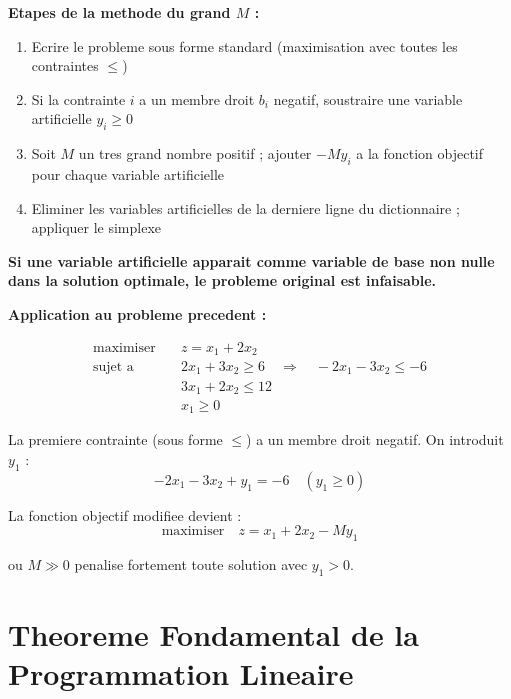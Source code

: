 \documentclass[12pt,a4paper]{article}
\begin{document}
\begin{methode}
\textbf{Etapes de la methode du grand $M$ :}

\begin{enumerate}
    \item Ecrire le probleme sous forme standard (maximisation avec toutes les contraintes $\leq$)
    \item Si la contrainte $i$ a un membre droit $b_i$ negatif, soustraire une variable artificielle $y_i \geq 0$
    \item Soit $M$ un tres grand nombre positif ; ajouter $-My_i$ a la fonction objectif pour chaque variable artificielle
    \item Eliminer les variables artificielles de la derniere ligne du dictionnaire ; appliquer le simplexe
\end{enumerate}

\textcolor{importantrouge}{\textbf{Si une variable artificielle apparait comme variable de base non nulle dans la solution optimale, le probleme original est infaisable.}}
\end{methode}

\begin{exemple}
\textbf{Application au probleme precedent :}

\begin{align*}
\text{maximiser} \quad & z = x_1 + 2x_2\\
\text{sujet a} \quad & 2x_1 + 3x_2 \geq 6 \quad \Rightarrow \quad -2x_1 - 3x_2 \leq -6\\
& 3x_1 + 2x_2 \leq 12\\
& x_1 \geq 0
\end{align*}

La premiere contrainte (sous forme $\leq$) a un membre droit negatif. On introduit $y_1$ :
$$-2x_1 - 3x_2 + y_1 = -6 \quad (y_1 \geq 0)$$

La fonction objectif modifiee devient :
$$\text{maximiser} \quad z = x_1 + 2x_2 - My_1$$

ou $M \gg 0$ penalise fortement toute solution avec $y_1 > 0$.
\end{exemple}

\section{Theoreme Fondamental de la Programmation Lineaire}

\end{document}

